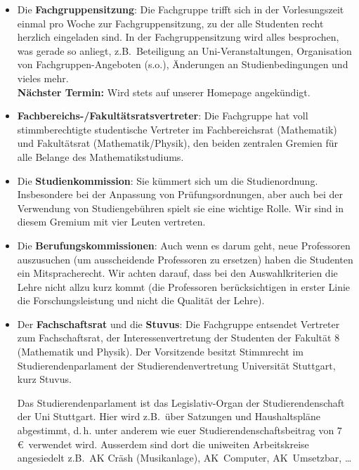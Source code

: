 \begin{itemize}
\item
Die {\bf Fachgruppensitzung}:
Die Fachgruppe trifft sich in der Vorlesungszeit
einmal pro Woche zur Fachgruppensitzung,
zu der alle Studenten recht herzlich eingeladen sind.
In der Fachgruppensitzung wird alles besprochen,
was gerade so anliegt, z.B.\ Beteiligung an Uni-Veranstaltungen,
Organisation von Fachgruppen-Angeboten (s.o.),
Änderungen an Studienbedingungen und vieles mehr.\\
{\bf Nächster Termin:} Wird stets auf unserer Homepage angekündigt.

\item
{\bf Fachbereichs-/Fakultätsratsvertreter}:
Die Fachgruppe hat voll stimmberechtigte studentische Vertreter
im Fachbereichsrat (Mathematik) und Fakultätsrat (Mathematik/Physik),
den beiden zentralen Gremien für alle Belange des Mathematikstudiums.

\item
Die {\bf Studienkommission}:
Sie kümmert sich um die Studienordnung.
Insbesondere bei der Anpassung von Prüfungsordnungen,
aber auch bei der Verwendung von Studiengebühren
spielt sie eine wichtige Rolle.
Wir sind in diesem Gremium mit vier Leuten vertreten.

\item
Die {\bf Berufungskommissionen}:
Auch wenn es darum geht, neue Professoren auszusuchen
(um ausscheidende Professoren zu ersetzen)
haben die Studenten ein Mitspracherecht.
Wir achten darauf, dass bei den Auswahlkriterien
die Lehre nicht allzu kurz kommt
(die Professoren berücksichtigen in erster Linie die
Forschungsleistung und nicht die Qualität der Lehre).

\item
Der {\bf Fachschaftsrat} und die {\bf Stuvus}:
Die Fachgruppe entsendet Vertreter zum Fachschaftsrat,
der Interessenvertretung der Studenten der Fakultät $8$
(Mathematik und Physik).
Der Vorsitzende besitzt Stimmrecht im Studierendenparlament
der Studierendenvertretung Universität Stuttgart, kurz Stuvus. 

\newpage
Das Studierendenparlament ist das Legislativ-Organ
der Studierendenschaft der Uni Stuttgart.
Hier wird z.B.\ über Satzungen und Haushaltspläne abgestimmt,
d.\,h. unter anderem wie euer Studierendenschaftsbeitrag
von $7$\euro\ verwendet wird.
Ausserdem sind dort die uniweiten Arbeitskreise angesiedelt
z.B.\ AK Cräsh (Musikanlage), AK~Computer, AK~Umsetzbar, \dots \\
\end{itemize}

